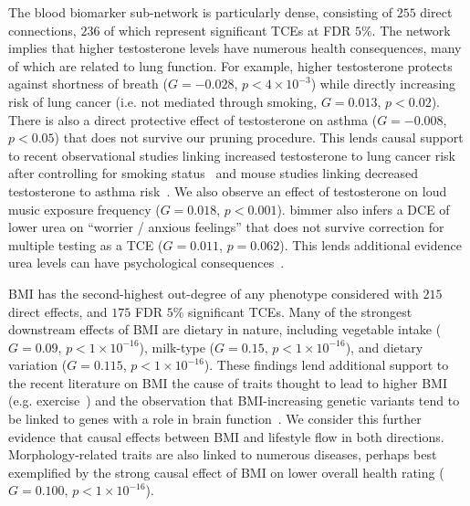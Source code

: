 \documentclass{article}
\begin{document}
The blood biomarker sub-network is particularly dense,
consisting of $255$ direct connections, $236$ of which represent
significant TCEs at FDR $5\%$.
The network implies that higher testosterone levels have numerous health consequences, many of
which are related to lung function. For example, higher testosterone protects against
shortness of breath ($G = -0.028$, $p < 4\times 10^{-3}$)
while directly increasing risk of lung cancer (i.e. not mediated through smoking, $G = 0.013$, $p < 0.02$).
There is also a direct protective effect of testosterone on asthma ($G = -0.008$, $p < 0.05$) that
does not survive our pruning procedure. This lends causal support to
recent observational studies linking increased testosterone to lung cancer risk after controlling
for smoking status~\cite{Hyde2012}
and mouse studies linking decreased testosterone to asthma risk~\cite{Cephus2017}.
We also observe an effect of testosterone on loud
music exposure frequency ($G = 0.018$, $p < 0.001$). bimmer also infers a DCE of lower urea
on ``worrier / anxious feelings'' that does not survive correction for multiple testing as
a TCE ($G = 0.011$, $p = 0.062$). This lends additional evidence urea levels can have psychological
consequences~\cite{Casey1973,Segers1976,Wang2019}.

BMI has the second-highest out-degree of any phenotype considered with
$215$ direct effects, and $175$ FDR $5\%$ significant TCEs.
Many of the strongest downstream effects of BMI are dietary
in nature, including vegetable intake ($G = 0.09$, $p < 1\times 10^{-16}$),
milk-type ($G = 0.15$, $p < 1\times 10^{-16}$), and dietary variation ($G = 0.115$, $p < 1\times 10^{-16}$).
These findings lend additional support to the recent literature on BMI the cause of
traits thought to lead to higher BMI (e.g. exercise~\cite{Richmond2014}) and the observation that
BMI-increasing genetic variants tend to be linked to genes with a role in brain
function~\cite{Locke2015,Zhu2016,Ndiaye2020}. We consider this further evidence that causal effects between
BMI and lifestyle flow in both directions.
Morphology-related traits are also linked
to numerous diseases, perhaps best exemplified by the strong causal effect of BMI on lower overall
health rating ($G = 0.100$, $p < 1 \times 10^{-16}$).
\end{document}
